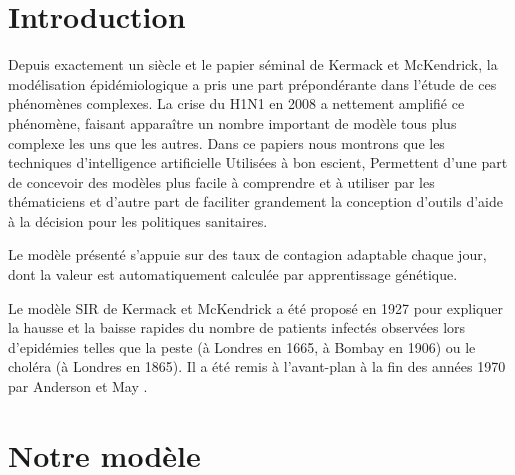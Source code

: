 \documentclass[review]{elsarticle}
\begin{document}
\linenumbers

\section{Introduction}

Depuis exactement un siècle et le papier séminal de Kermack et
McKendrick, la modélisation épidémiologique a pris une part
prépondérante dans l’étude de ces phénomènes complexes. La crise du
H1N1 en 2008 a nettement amplifié ce phénomène, faisant apparaître un
nombre important de modèle tous plus complexe les uns que les
autres. Dans ce papiers nous montrons que les techniques
d’intelligence artificielle Utilisées à bon escient, Permettent d’une
part de concevoir des modèles plus facile à comprendre et à utiliser
par les thématiciens et d’autre part de faciliter grandement la
conception d’outils d’aide à la décision pour les politiques
sanitaires.


Le modèle présenté s'appuie sur des taux de contagion
adaptable chaque jour, dont la valeur est automatiquement calculée par
apprentissage génétique.



Le modèle SIR de Kermack et McKendrick \cite{} a été proposé en 1927 pour expliquer la hausse et la baisse rapides du nombre de patients infectés observées lors d'epidémies telles que la peste (à Londres en 1665, à Bombay en 1906) ou le choléra (à Londres en 1865). Il a été remis à l’avant-plan à la fin des années 1970 par Anderson et May \cite{}.




\section{Notre modèle}



\hfill {} \hfill \
\end{document}
